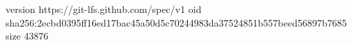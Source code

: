 version https://git-lfs.github.com/spec/v1
oid sha256:2ecbd0395ff16ed17bac45a50d5c70244983da37524851b557beed56897b7685
size 43876
